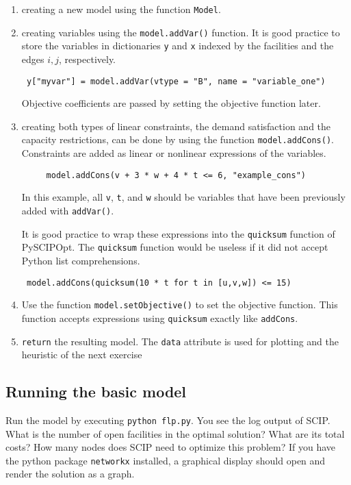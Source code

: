 \documentclass[a4paper,10pt]{article}
\begin{document}
\begin{enumerate}
 \item creating a new model using the function \texttt{Model}.
 \item creating variables using the \texttt{model.addVar()} function. It is good practice to store the variables in dictionaries \texttt{y} and \texttt{x} indexed by the facilities
 and the edges $i,j$, respectively.
\begin{lstlisting}
 y["myvar"] = model.addVar(vtype = "B", name = "variable_one")
\end{lstlisting}
Objective coefficients are passed by setting the objective function later.

 \item creating both types of linear constraints, the demand satisfaction and the capacity restrictions, can be done by using the function \texttt{model.addCons()}.
 Constraints are added as linear or nonlinear expressions of the variables.
 \begin{lstlisting}
     model.addCons(v + 3 * w + 4 * t <= 6, "example_cons")
 \end{lstlisting}
 In this example, all \texttt{v}, \texttt{t}, and \texttt{w} should be variables that have been previously added with \texttt{addVar()}.

 It is good practice to wrap these expressions
 into the \texttt{quicksum} function of PySCIPOpt.
 The \texttt{quicksum} function would be useless if it did not accept
 Python list comprehensions.
 \begin{lstlisting}
 model.addCons(quicksum(10 * t for t in [u,v,w]) <= 15)
 \end{lstlisting}

 \item Use the function \texttt{model.setObjective()} to set the objective function. This function accepts expressions using \texttt{quicksum} exactly like \texttt{addCons}.

 \item \texttt{return} the resulting model. The \texttt{data} attribute is used for plotting and the heuristic of the next exercise
\end{enumerate}

\subsection{Running the basic model}

Run the model by executing \texttt{python flp.py}. You see the log output of SCIP. What is the number of open facilities in the optimal solution? What are its total costs? How many nodes does SCIP need to optimize this problem? If you have the python package \texttt{networkx} installed, a graphical display should open and render the solution as a graph.
\end{document}
